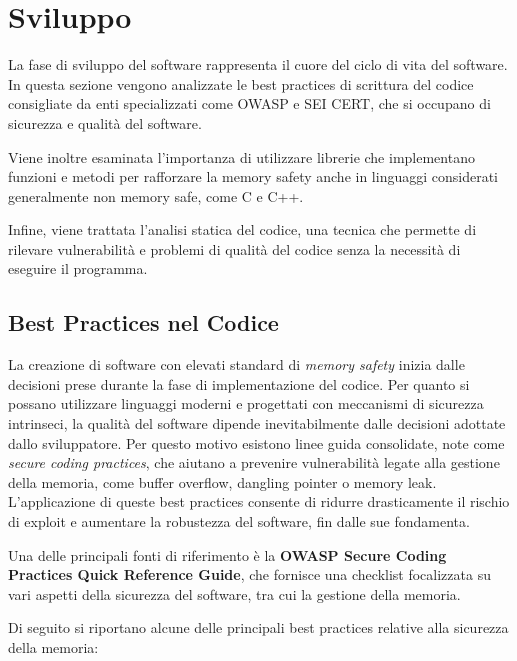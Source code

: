 \section{Sviluppo}
\label{sec:development}

La fase di sviluppo del software rappresenta il cuore del ciclo di vita del software.
In questa sezione vengono analizzate le best practices di scrittura del codice
consigliate da enti specializzati come OWASP e SEI CERT, che si occupano di sicurezza
e qualità del software.

Viene inoltre esaminata l'importanza di utilizzare librerie che implementano funzioni
e metodi per rafforzare la memory safety anche in linguaggi considerati generalmente
non memory safe, come C e C++.

Infine, viene trattata l'analisi statica del codice, una tecnica che permette di
rilevare vulnerabilità e problemi di qualità del codice senza la necessità di
eseguire il programma.

\subsection{Best Practices nel Codice}
\label{sec:best-practices-codice}

La creazione di software con elevati standard di \textit{memory safety} inizia
dalle decisioni prese durante la fase di implementazione del codice. Per quanto si
possano utilizzare linguaggi moderni e progettati con meccanismi di sicurezza intrinseci,
la qualità del software dipende inevitabilmente dalle decisioni adottate dallo
sviluppatore. Per questo motivo esistono linee guida consolidate, note come
\textit{secure coding practices}, che aiutano a prevenire vulnerabilità legate
alla gestione della memoria, come buffer overflow, dangling pointer o memory
leak. L'applicazione di queste best practices consente di ridurre drasticamente il
rischio di exploit e aumentare la robustezza del software, fin dalle sue
fondamenta.

Una delle principali fonti di riferimento è la \textbf{OWASP Secure Coding
Practices Quick Reference Guide}\cite{owasp_best_practices}, che fornisce una checklist
focalizzata su vari aspetti della sicurezza del software, tra cui la gestione
della memoria.

Di seguito si riportano alcune delle principali best practices relative alla
sicurezza della memoria:

